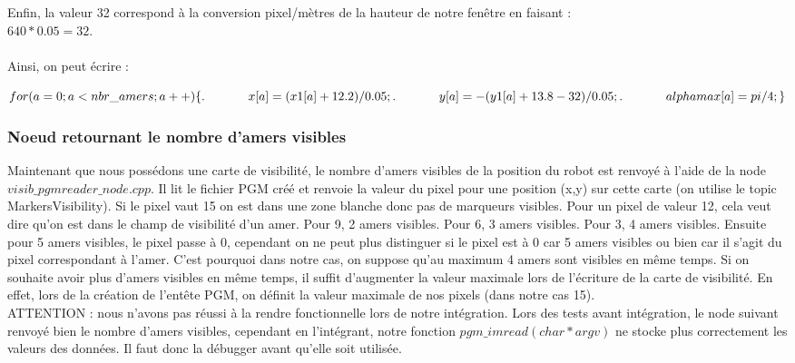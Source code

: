 \documentclass[10pt,a4paper]{article}
\begin{document}
Enfin, la valeur 32 correspond à la conversion pixel/mètres de la hauteur de notre fenêtre en faisant :\\ $640*0.05=32$.\\
\\
Ainsi, on peut écrire :

$\\
for(a=0;a<nbr\_amers;a++) ~\\
	\{  ~\\
. \hspace{35pt}    x[a]=(x1[a]+12.2)/0.05; ~\\
. \hspace{35pt}    y[a]=-(y1[a]+13.8-32)/0.05; ~\\
. \hspace{35pt}    alphamax[a]=pi/4; ~\\
	\} ~\\
	$

\subsubsection{Noeud retournant le nombre d'amers visibles}
Maintenant que nous possédons une carte de visibilité, le nombre d'amers visibles de la position du robot est renvoyé à l'aide de la node $visib\_pgmreader\_node.cpp$. Il lit le fichier PGM créé et renvoie la valeur du pixel pour une position (x,y) sur cette carte (on utilise le topic MarkersVisibility). Si le pixel vaut 15 on est dans une zone blanche donc pas de marqueurs visibles. Pour un pixel de valeur 12, cela veut dire qu'on est dans le champ de visibilité d'un amer. Pour 9, 2 amers visibles. Pour 6, 3 amers visibles. Pour 3, 4 amers visibles. Ensuite pour 5 amers visibles, le pixel passe à 0, cependant on ne peut plus distinguer si le pixel est à 0 car 5 amers visibles ou bien car il s'agit du pixel correspondant à l'amer. C'est pourquoi dans notre cas, on suppose qu'au maximum 4 amers sont visibles en même temps. 
Si on souhaite avoir plus d'amers visibles en même temps, il suffit d'augmenter la valeur maximale lors de l’écriture de la carte de visibilité. En effet, lors de la création de l’entête PGM, on définit la valeur maximale de nos pixels (dans notre cas 15).\\

ATTENTION : nous n'avons pas réussi à la rendre fonctionnelle lors de notre intégration. Lors des tests avant intégration, le node suivant renvoyé bien le nombre d'amers visibles, cependant en l'intégrant, notre fonction $pgm\_imread(char *argv)$ ne stocke plus correctement les valeurs des données. Il faut donc la débugger avant qu'elle soit utilisée.
\end{document}
